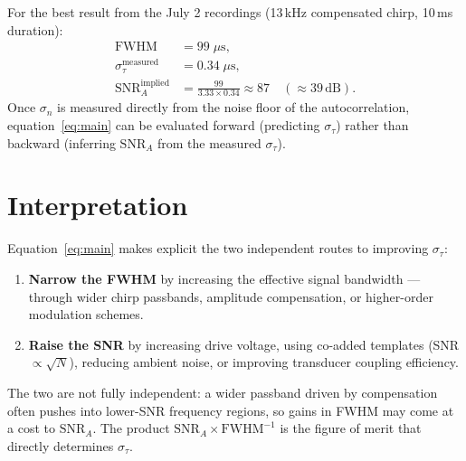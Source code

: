 \documentclass[11pt]{article}
\begin{document}
For the best result from the July 2 recordings
(13\,kHz compensated chirp, 10\,ms duration):
\begin{align*}
  \mathrm{FWHM} &= 99\;\mu\mathrm{s}, \\
  \sigma_\tau^{\mathrm{measured}} &= 0.34\;\mu\mathrm{s}, \\
  \mathrm{SNR}_A^{\mathrm{implied}} &= \frac{99}{3.33 \times 0.34} \approx 87
    \quad(\approx 39\,\mathrm{dB}).
\end{align*}
Once $\sigma_n$ is measured directly from the noise floor of the autocorrelation,
equation~\eqref{eq:main} can be evaluated forward (predicting $\sigma_\tau$) rather
than backward (inferring $\mathrm{SNR}_A$ from the measured $\sigma_\tau$).

\section{Interpretation}

Equation~\eqref{eq:main} makes explicit the two independent routes to improving
$\sigma_\tau$:

\begin{enumerate}
  \item \textbf{Narrow the FWHM} by increasing the effective signal bandwidth ---
        through wider chirp passbands, amplitude compensation, or higher-order
        modulation schemes.
  \item \textbf{Raise the SNR} by increasing drive voltage, using co-added
        templates (SNR $\propto \sqrt{N}$), reducing ambient noise, or improving
        transducer coupling efficiency.
\end{enumerate}
The two are not fully independent: a wider passband driven by compensation often
pushes into lower-SNR frequency regions, so gains in FWHM may come at a cost to
$\mathrm{SNR}_A$.  The product $\mathrm{SNR}_A \times \mathrm{FWHM}^{-1}$ is the
figure of merit that directly determines $\sigma_\tau$.
\end{document}
